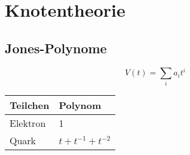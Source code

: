\section{Knotentheorie}
\subsection*{Jones-Polynome}
\[ V(t) = \sum_{i} a_i t^i \]

\begin{table}[H]
    \centering
    \begin{tabular}{ll}
        \toprule
        Teilchen & Polynom \\
        \midrule
        Elektron & 1 \\
        Quark & $t + t^{-1} + t^{-2}$ \\
        \bottomrule
    \end{tabular}
\end{table}